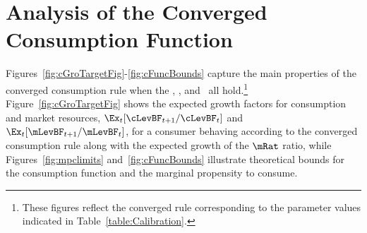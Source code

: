 \documentclass[BufferStockTheory]{subfiles}
\begin{document}
\hypertarget{AnalysisoftheConvergedConsumptionFunction}{}
\section{Analysis of the Converged Consumption Function}\label{sec:convergedcfunc}

Figures~\ref{fig:cGroTargetFig}-\ref{fig:cFuncBounds} capture the
main properties of the converged consumption rule when the \RIC, \GICNrm,
and \FHWC~all hold.\footnote{These figures reflect the converged rule
  corresponding to the parameter values indicated in
  Table~\ref{table:Calibration}.}  Figure~\ref{fig:cGroTargetFig}
shows the expected growth factors for consumption and market resources,
$\Ex_{t}[\cLevBF_{t+1}/\cLevBF_{t}]$ and $\Ex_{t}[\mLevBF_{t+1}/\mLevBF_{t}]$, for a consumer behaving according to the converged consumption rule along with the expected growth of the $\mRat$ ratio, while Figures~\ref{fig:mpclimits} and~\ref{fig:cFuncBounds} illustrate theoretical bounds for the consumption function and the
marginal propensity to consume.
\end{document}

